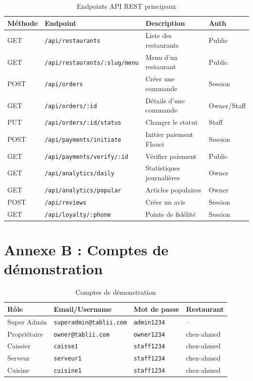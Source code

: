 \documentclass[12pt,a4paper]{report}
\begin{document}
\begin{table}[H]
    \centering
    \caption{Endpoints API REST principaux}
    \label{tab:api}
    \small
    \begin{tabularx}{\textwidth}{llXl}
        \toprule
        \textbf{Méthode} & \textbf{Endpoint} & \textbf{Description} & \textbf{Auth} \\
        \midrule
        GET & \texttt{/api/restaurants} & Liste des restaurants & Public \\
        GET & \texttt{/api/restaurants/:slug/menu} & Menu d'un restaurant & Public \\
        POST & \texttt{/api/orders} & Créer une commande & Session \\
        GET & \texttt{/api/orders/:id} & Détails d'une commande & Owner/Staff \\
        PUT & \texttt{/api/orders/:id/status} & Changer le statut & Staff \\
        POST & \texttt{/api/payments/initiate} & Initier paiement Flouci & Session \\
        GET & \texttt{/api/payments/verify/:id} & Vérifier paiement & Public \\
        GET & \texttt{/api/analytics/daily} & Statistiques journalières & Owner \\
        GET & \texttt{/api/analytics/popular} & Articles populaires & Owner \\
        POST & \texttt{/api/reviews} & Créer un avis & Session \\
        GET & \texttt{/api/loyalty/:phone} & Points de fidélité & Session \\
        \bottomrule
    \end{tabularx}
\end{table}

\section{Annexe B : Comptes de démonstration}

\begin{table}[H]
    \centering
    \caption{Comptes de démonstration}
    \label{tab:demo}
    \begin{tabularx}{\textwidth}{llll}
        \toprule
        \textbf{Rôle} & \textbf{Email/Username} & \textbf{Mot de passe} & \textbf{Restaurant} \\
        \midrule
        Super Admin & \texttt{superadmin@tablii.com} & \texttt{admin1234} & -- \\
        Propriétaire & \texttt{owner@tablii.com} & \texttt{owner1234} & chez-ahmed \\
        Caissier & \texttt{caisse1} & \texttt{staff1234} & chez-ahmed \\
        Serveur & \texttt{serveur1} & \texttt{staff1234} & chez-ahmed \\
        Cuisine & \texttt{cuisine1} & \texttt{staff1234} & chez-ahmed \\
        \bottomrule
    \end{tabularx}
\end{table}
\end{document}
